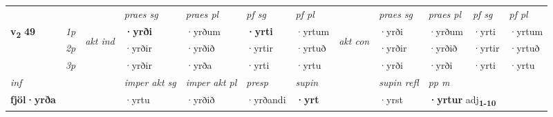 \begin{longtable}[l]{X>{\footnotesize\itshape}llXXXXlXXXX}
 & &   & \textit{praes sg}  & \textit{praes pl}    & \textit{ pf sg} & \textit{pf pl} & & \textit{praes sg}  & \textit{praes pl}    & \textit{pf sg} & \textit{pf pl }  \\ \cmidrule{4-7} \cmidrule{9-12}
 \multirow{2}{*}{{{\textbf{v{\textsubscript{2}}} \Large{\textbf{49}}}}}  & 1p & \multirow{3}{*}{\begin{turn}{90}\textit{akt ind}\end{turn}} & \textbf{·yrði} & ·yrðum & \textbf{·yrti} & ·yrtum & \multirow{3}{*}{\begin{turn}{90}\textit{akt con}\end{turn}} &·yrði & ·yrðum & ·yrti & ·yrtum\\*
 & 2p &  &  ·yrðir  & ·yrðið & ·yrtir & ·yrtuð & & ·yrðir & ·yrðið & ·yrtir & ·yrtuð \\*
 & 3p &  & ·yrðir & ·yrða & ·yrti & ·yrtu & & ·yrði & ·yrði& ·yrti & ·yrtu \\*
\cmidrule{4-7} \cmidrule{9-12}

   {\textit{inf}} & &  & \textit{imper akt sg} & \textit{imper akt pl}   & \textit{presp} & \textit{supin} && \textit{supin refl} & \textit{pp m} \\*
  {\textbf{fjöl\allowbreak ·yrða}} & && ·yrtu  & ·yrðið   & ·yrðandi &  \textbf{·yrt} && ·yrst & \multicolumn{2}{l}{\textbf{·yrtur} adj\textbf{\textsubscript{1-10}}} \\*

\midrule


\end{longtable}
